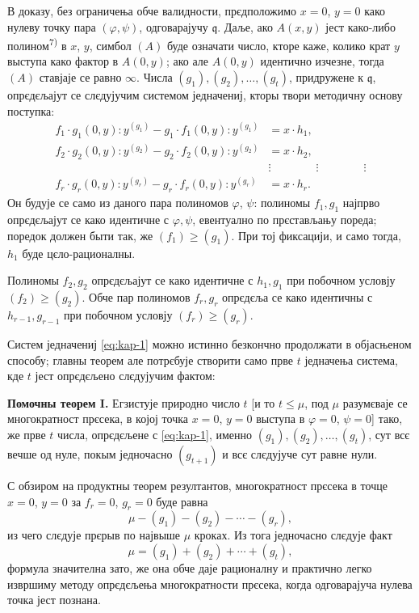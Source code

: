 \documentclass[11pt]{article}
\theoremstyle{plain}
\begin{document}
В доказу, без ограничења обче валидности, прєдположимо $x = 0$,
$y = 0$ како нулеву точку пара $(\varphi, \psi)$, одговарајучу
$\mathfrak{q}$. Даље, ако $A(x,y)$ јест како-либо полином\textsuperscript{7)}
в $x$, $y$, симбол $(A)$ буде означати число, кторе каже, колико
крат $y$ выступа како фактор в $A(0,y)$; ако але $A(0,y)$
идентично изчезне, тогда $(A)$ ставјаје се равно $\infty$. Числа
$(g_{1}), (g_{2}), \ldots, (g_{t})$, придружене к $\mathfrak{q}$,
опрєдєљајут се слєдујучим системом једначениј, кторы твори
методичну основу поступка:
\begin{equation}\label{eq:kap-1}
\begin{aligned}
f_{1}\cdot g_{1}(0,y):y^{(g_{1})} - g_{1}\cdot f_{1}(0,y):y^{(g_{1})} &= x\cdot h_{1},\\
f_{2}\cdot g_{2}(0,y):y^{(g_{2})} - g_{2}\cdot f_{2}(0,y):y^{(g_{2})} &= x\cdot h_{2},\\
&\vdots \qquad\qquad\vdots\qquad\qquad\vdots\\
f_{r}\cdot g_{r}(0,y):y^{(g_{r})} - g_{r}\cdot f_{r}(0,y):y^{(g_{r})} &= x\cdot h_{r}.
\end{aligned}
\end{equation}
Он будује се само из даного пара полиномов $\varphi$, $\psi$:
полиномы $f_{1}, g_{1}$ најпрво опрєдєљајут се како идентичне с
$\varphi, \psi$, евентуално по прєстављању пореда; поредок
должен быти так, же $(f_{1}) \geq (g_{1})$. При тој фиксацији, и
само тогда, $h_{1}$ буде цєло-рационалны.

Полиномы $f_{2}, g_{2}$ опрєдєљајут се како идентичне с
$h_{1}, g_{1}$ при побочном условју $(f_{2}) \geq (g_{2})$. Обче пар
полиномов $f_{r}, g_{r}$ опрєдєља се како идентичны с
$h_{r-1}, g_{r-1}$ при побочном условју $(f_{r}) \geq (g_{r})$.

Систем једначениј \eqref{eq:kap-1} можно истинно безкончно
продолжати в објасњеном способу; главны теорем але потрєбује
створити само прве $t$ једначења система, кде $t$ јест опрєдєљено
слєдујучим фактом:

\smallskip
\textbf{Помочны теорем I.} Егзистује природно число $t$ [и то
$t \leq \mu$, под $\mu$ разумєваје се многократност прєсека, в којој
точка $x = 0$, $y = 0$ выступа в $\varphi = 0$, $\psi = 0$] тако, же
прве $t$ числа, опрєдєљене с \eqref{eq:kap-1}, именно
$(g_{1}), (g_{2}), \ldots, (g_{t})$, сут всє вечше од нуле, покым
једночасно $(g_{t+1})$ и всє слєдујуче сут равне нули.

С обзиром на продуктны теорем резултантов, многократност
прєсека в точце $x = 0$, $y = 0$ за $f_{r} = 0$, $g_{r} = 0$ буде
равна
\[
\mu - (g_{1}) - (g_{2}) - \cdots - (g_{r}),
\]
из чего слєдује прєрыв по највыше $\mu$ кроках. Из тога једночасно
слєдује факт
\begin{equation}\label{eq:kap-2}
\mu = (g_{1}) + (g_{2}) + \cdots + (g_{t}),
\end{equation}
формула значителна зато, же она обче даје рационалну и практично
легко извршиму методу опрєдєљења многократности прєсека, когда
одговарајуча нулева точка јест познана.
\end{document}
